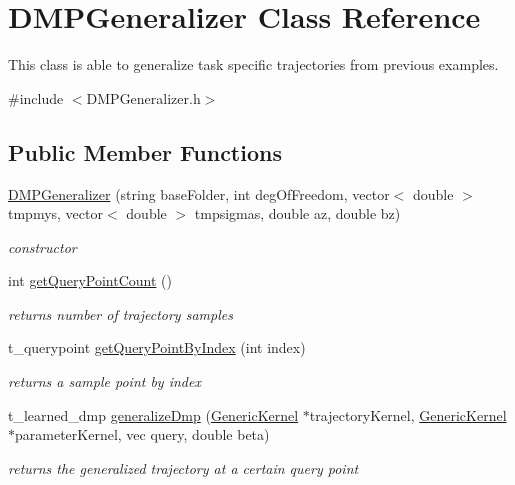 \hypertarget{classDMPGeneralizer}{\section{\-D\-M\-P\-Generalizer \-Class \-Reference}
\label{classDMPGeneralizer}
}


\-This class is able to generalize task specific trajectories from previous examples.  




{\ttfamily \#include $<$\-D\-M\-P\-Generalizer.\-h$>$}

\subsection*{\-Public \-Member \-Functions}
\begin{DoxyCompactItemize}
\item 
\hyperlink{classDMPGeneralizer_a303eae31baa6a2c7b897c0fc23a8686c}{\-D\-M\-P\-Generalizer} (string base\-Folder, int deg\-Of\-Freedom, vector$<$ double $>$ tmpmys, vector$<$ double $>$ tmpsigmas, double az, double bz)
\begin{DoxyCompactList}\small\item\em constructor \end{DoxyCompactList}\item 
int \hyperlink{classDMPGeneralizer_a879e11ed7717071401af84c6a42a7bf2}{get\-Query\-Point\-Count} ()
\begin{DoxyCompactList}\small\item\em returns number of trajectory samples \end{DoxyCompactList}\item 
t\-\_\-querypoint \hyperlink{classDMPGeneralizer_a6e725b20d17d60f1851d4c812a0afa92}{get\-Query\-Point\-By\-Index} (int index)
\begin{DoxyCompactList}\small\item\em returns a sample point by index \end{DoxyCompactList}\item 
t\-\_\-learned\-\_\-dmp \hyperlink{classDMPGeneralizer_a1abc5c3749209d570467042757b5c462}{generalize\-Dmp} (\hyperlink{classGenericKernel}{\-Generic\-Kernel} $\ast$trajectory\-Kernel, \hyperlink{classGenericKernel}{\-Generic\-Kernel} $\ast$parameter\-Kernel, vec query, double beta)
\begin{DoxyCompactList}\small\item\em returns the generalized trajectory at a certain query point \end{DoxyCompactList}\end{DoxyCompactItemize}


